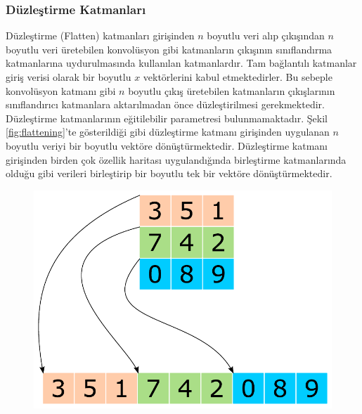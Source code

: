 \subsubsection{Düzleştirme Katmanları}
Düzleştirme (Flatten) katmanları girişinden $n$ boyutlu veri alıp çıkışından $n$ boyutlu veri üretebilen konvolüsyon gibi katmanların çıkışının sınıflandırma katmanlarına uydurulmasında kullanılan katmanlardır. Tam bağlantılı katmanlar giriş verisi olarak bir boyutlu $x$ vektörlerini kabul etmektedirler. Bu sebeple konvolüsyon katmanı gibi $n$ boyutlu çıkış üretebilen katmanların çıkışlarının sınıflandırıcı katmanlara aktarılmadan önce düzleştirilmesi gerekmektedir. Düzleştirme katmanlarının eğitilebilir parametresi bulunmamaktadır. Şekil \ref{fig:flattening}'te gösterildiği gibi düzleştirme katmanı girişinden uygulanan $n$ boyutlu veriyi bir boyutlu vektöre dönüştürmektedir. Düzleştirme katmanı girişinden birden çok özellik haritası uygulandığında birleştirme katmanlarında olduğu gibi verileri birleştirip bir boyutlu tek bir vektöre dönüştürmektedir.

\begin{figure}[h!]
	\begin{center}
		\vspace{0.4cm}
		{
			\vspace{0.4cm}
			\includegraphics[scale=0.6]{Yapilan-Calismalar/Figures/flattening.pdf}
		}
	\end{center}
\end{figure}

